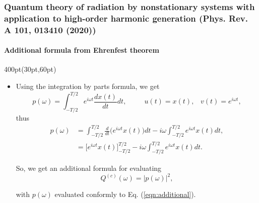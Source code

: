 \begin{frame}
\frametitle{Quantum theory of radiation by nonstationary systems 
	with application to high-order harmonic generation
        (Phys. Rev. A 101, 013410 (2020))}
	\framesubtitle{Additional formula from Ehrenfest theorem}

\begin{textblock*}{400pt}(30pt,60pt)
\footnotesize
\begin{itemize}
\item  Using the integration by parts formula, we get
\begin{equation}
   p(\omega) = \int_{-T/2}^{T/2} e^{i\omega t} \frac{dx(t)}{dt}dt,\hspace{30pt}
   u(t) = x(t),\;\;\; v(t) = e^{i\omega t},
\end{equation}
\noindent thus
\begin{align}
   p(\omega) & = \int_{-T/2}^{T/2} \frac{d}{dt}\Big(e^{i\omega t}x(t)\Big)dt
    -i\omega \int_{-T/2}^{T/2} e^{i\omega t}x(t)dt, \\
             & = \Bigg[ e^{i\omega t} x(t)\Bigg]_{-T/2}^{T/2}
               -i\omega \int_{-T/2}^{T/2} e^{i\omega t}x(t)dt. 
\label{eqn:additional}
\end{align}

So, we get an additional formula for evaluating 
\begin{equation}
Q^{(c)}(\omega) = \left| p(\omega) \right|^2,
\end{equation}

\noindent with $p(\omega)$ evaluated conformly to Eq. (\ref{eqn:additional}).



\end{itemize}
\end{textblock*}



\end{frame}





